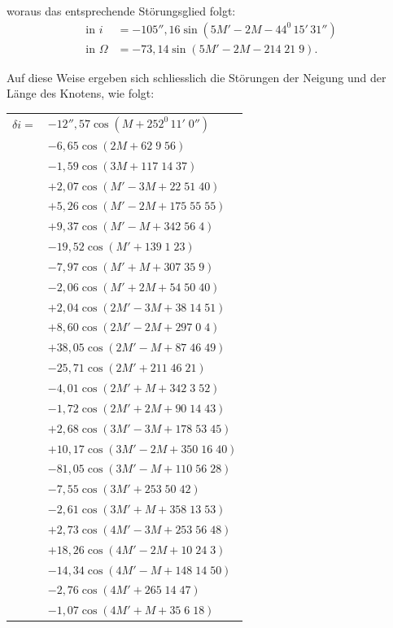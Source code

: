 \endgroup
\noindent woraus das entsprechende Störungsglied folgt:
\[
\begin{aligned}
\text{in }i&=-105''{,}16\sin(5M'-2M-44^0\,15'\,31'')\\
\text{in }\Omega&=-73{,}14\sin(5M'-2M-214\;21\;9).
\end{aligned}
\]
\par\noindent\hspace*{\parindent}Auf diese Weise ergeben sich schliesslich die Störungen der Neigung und der Länge des Knotens, wie folgt:
\begingroup
\renewcommand{\arraystretch}{1.15}
\begin{longtable}{@{}r@{}l@{}}
\(\delta i={}\)&\(-12''{,}57\cos(M+252^0\,11'\;0'')\)\\
&\(-6{,}65\cos(2M+62\;9\;56)\)\\
&\(-1{,}59\cos(3M+117\;14\;37)\)\\
&\(+2{,}07\cos(M'-3M+22\;51\;40)\)\\
&\(+5{,}26\cos(M'-2M+175\;55\;55)\)\\
&\(+9{,}37\cos(M'-M+342\;56\;4)\)\\
&\(-19{,}52\cos(M'+139\;1\;23)\)\\
&\(-7{,}97\cos(M'+M+307\;35\;9)\)\\
&\(-2{,}06\cos(M'+2M+54\;50\;40)\)\\
&\(+2{,}04\cos(2M'-3M+38\;14\;51)\)\\
&\(+8{,}60\cos(2M'-2M+297\;0\;4)\)\\
&\(+38{,}05\cos(2M'-M+87\;46\;49)\)\\
&\(-25{,}71\cos(2M'+211\;46\;21)\)\\
&\(-4{,}01\cos(2M'+M+342\;3\;52)\)\\
&\(-1{,}72\cos(2M'+2M+90\;14\;43)\)\\
&\(+2{,}68\cos(3M'-3M+178\;53\;45)\)\\
&\(+10{,}17\cos(3M'-2M+350\;16\;40)\)\\
&\(-81{,}05\cos(3M'-M+110\;56\;28)\)\\
&\(-7{,}55\cos(3M'+253\;50\;42)\)\\
&\(-2{,}61\cos(3M'+M+358\;13\;53)\)\\
&\(+2{,}73\cos(4M'-3M+253\;56\;48)\)\\
&\(+18{,}26\cos(4M'-2M+10\;24\;3)\)\\
&\(-14{,}34\cos(4M'-M+148\;14\;50)\)\\
&\(-2{,}76\cos(4M'+265\;14\;47)\)\\
&\(-1{,}07\cos(4M'+M+35\;6\;18)\)\\

\end{longtable}
